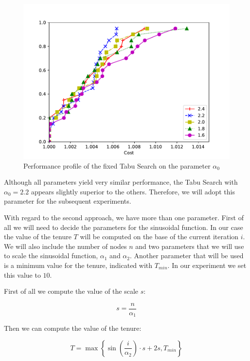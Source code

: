 \documentclass{article}
\begin{document}
\begin{figure}[ht]
        \caption{Performance profile of the fixed Tabu Search on the parameter $\alpha_0$}
        \label{fig:ht_fixten}
        \centering
        \includegraphics[width=340pt]{assets/ht_fixten.pdf}
\end{figure}

Although all parameters yield very similar performance, the Tabu Search with $\alpha_0 = 2.2$
appears slightly superior to the others. Therefore, we will adopt this parameter for the subsequent experiments.

\clearpage

With regard to the second approach, we have more than one parameter. First of
all we will need to decide the parameters for the sinusoidal function. In our
case the value of the tenure $T$ will be computed on the base of the current
iteration $i$. We will also include the number of nodes $n$ and two parameters
that we will use to scale the sinusoidal function, $\alpha_1$ and $\alpha_2$.
Another parameter that will be used is a minimum value for the tenure,
indicated with $T_{min}$. In our experiment we set this value to $10$.

First of all we compute the value of the scale $s$:

\begin{equation*}
        s = \frac{n}{\alpha_1}
\end{equation*}

Then we can compute the value of the tenure:

\begin{equation*}
        T = \max \left\{
                \sin \left( \frac{i}{\alpha_2} \right) \cdot s + 2 s ,
                T_{min}
        \right\}
\end{equation*}
\end{document}
